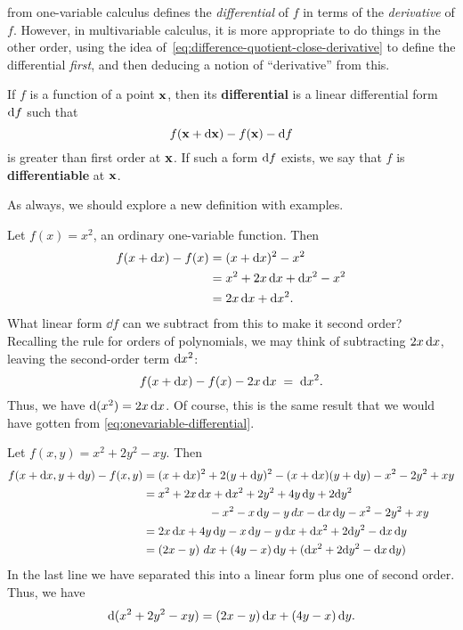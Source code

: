 \documentclass[12pt]{amsart}
\begin{document}
 from one-variable calculus defines the \emph{differential} of $f$ in terms of the \emph{derivative} of $f$.
However, in multivariable calculus, it is more appropriate to do things in the other order, using the idea of~\cref{eq:difference-quotient-close-derivative} to define the differential \emph{first}, and then deducing a notion of ``derivative'' from this.

\begin{defn}\label{def:differential}
  If $f$ is a function of a point $\mathbf{x}$, then its \textbf{differential} is a linear differential form $\mathrm{d} f$ such that
  \[ f(\mathbf{x} + \mathrm{d}\mathbf{x}) - f(\mathbf{x}) - \mathrm{d} f \]
  is greater than first order at $\mathbf{x}$.
  If such a form $\mathrm{d} f$ exists, we say that $f$ is \textbf{differentiable} at $\mathbf{x}$.
\end{defn}

As always, we should explore a new definition with examples.

\begin{eg}
  Let $f(x) = x^2$, an ordinary one-variable function.
  Then
  \begin{align*}
    f(x + \mathrm{d} x) - f(x) &= (x+\mathrm{d} x)^2 - x^2\\
    &= x^2 + 2 x \, \mathrm{d} x + \mathrm{d} x^2 - x^2\\
    &= 2x \, \mathrm{d} x + \mathrm{d} x ^2.
  \end{align*}
  What linear form $\dd f$ can we subtract from this to make it second order?
  Recalling the rule for orders of polynomials, we may think of subtracting $2x \, \mathrm{d} x$, leaving the second-order term $\mathrm{d} x^2$:
  \[ f(x + \mathrm{d} x) - f(x) - 2x \, \mathrm{d} x \;=\; \mathrm{d} x^2. \]
  Thus, we have $\mathrm{d}(x^2) = 2 x \, \mathrm{d} x$.
  Of course, this is the same result that we would have gotten from \cref{eq:onevariable-differential}.
\end{eg}

\begin{eg}
  Let $f(x,y) = x^2 + 2y^2 - xy$.
  Then
  \begin{align*}
    f(x+\mathrm{d} x,y+\mathrm{d} y) - f(x,y)
    &= (x+\mathrm{d} x)^2 + 2(y+\mathrm{d} y)^2 - (x+\mathrm{d} x)(y+\mathrm{d} y) - x^2 - 2y^2 + xy\\
    &= x^2 + 2 x \, \mathrm{d} x + \mathrm{d} x^2 + 2y^2 + 4y\,\mathrm{d} y + 2\mathrm{d} y^2\\
    & \hspace{2cm} - x^2 - x \, \mathrm{d} y - y \, dx - \mathrm{d} x\, \mathrm{d} y - x^2 - 2y^2 + xy\\
    &= 2x\,\mathrm{d} x + 4y\,\mathrm{d} y - x\,\mathrm{d} y - y\,\mathrm{d} x + \mathrm{d} x^2 + 2\mathrm{d} y^2 - \mathrm{d} x\,\mathrm{d} y\\
    &= (2x-y)\,\,dx + (4y-x)\,\mathrm{d} y + (\mathrm{d} x^2 + 2\mathrm{d} y^2 - \mathrm{d} x\,\mathrm{d} y)
  \end{align*}
  In the last line we have separated this into a linear form plus one of second order.
  Thus, we have
  \[ \mathrm{d}(x^2 + 2y^2 - xy) = (2x-y)\,\mathrm{d} x + (4y-x)\,\mathrm{d} y .\]
\end{eg}
\end{document}

